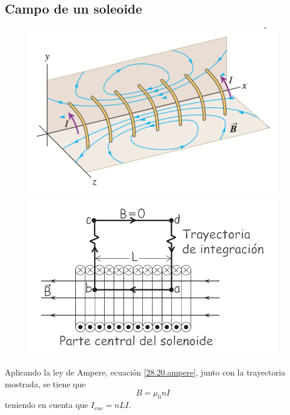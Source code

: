 \subsection{Campo de un soleoide}
\begin{figure}[h]
\centering
\includegraphics[scale=0.4]{fig/solenoide1}
\includegraphics[scale=0.4]{fig/solenoide2}
\end{figure}
Aplicando la ley de Ampere, ecuación \ref{28.20.ampere}, junto con la trayectoria mostrada, se tiene que 
\begin{equation}
B=\mu_0nI
\end{equation}
teniendo en cuenta que $I_{enc}=nLI$.
